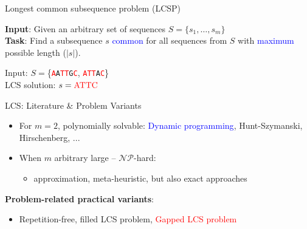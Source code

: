 \documentclass{beamer}
\begin{document}
\begin{frame}{Longest common subsequence problem (LCSP)}
   
    
    \begin{definition}[LCSP]
        \textbf{Input}: Given an arbitrary set of sequences $S=\{s_1, \ldots, s_m\}$ \\
        \textbf{Task}: Find a   subsequence $s$  \textcolor{blue}{common} for all sequences from $S$ with \textcolor{blue}{maximum} possible length ($|s|$). 
    \end{definition} \vspace{0.5cm}
    \begin{example}
       Input: $S=$\{\texttt{\textcolor{red}{A}A\textcolor{red}{T}\textcolor{red}{T}G\textcolor{red}{C}}, \texttt{\textcolor{red}{A}\textcolor{red}{T}\textcolor{red}{T}A\textcolor{red}{C}}\} \\ 
       LCS solution: $s=\text{\textcolor{red}{ATTC}}$
    \end{example}
        \vspace{0.3cm}
\end{frame}

\begin{frame}{LCS: Literature \& Problem Variants }
  \begin{itemize}
  \item For $m=2$, polynomially solvable: \textcolor{blue}{Dynamic programming}, Hunt-Szymanski, Hirschenberg,  ... 
 \vspace{0.2cm}
  \item When $m$ arbitrary large -- $\mathcal{NP}$-hard:
   \begin{itemize}
   \item %
    approximation, meta-heuristic, but also exact approaches   
   \end{itemize}  
  \end{itemize}\vspace{0.5cm}
  
  \textbf{Problem-related practical variants}:
  \begin{itemize}
  		\item   Repetition-free, filled LCS problem, \textcolor{red}{Gapped LCS problem}
  \end{itemize}
\end{frame}
\end{document}
